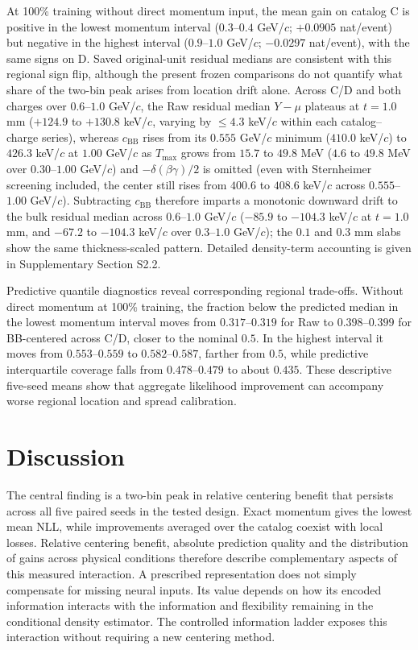 \documentclass[twocolumn,epjc3]{svjour3}
\begin{document}
At 100\% training without direct momentum input, the mean gain on catalog C
is positive in the lowest momentum interval ($0.3$--$0.4$ GeV/$c$;
$+0.0905$ nat/event) but negative in the highest interval
($0.9$--$1.0$ GeV/$c$; $-0.0297$ nat/event), with the same signs on D.
Saved original-unit residual medians are consistent with this regional sign
flip, although the present frozen comparisons do not quantify what share of the
two-bin peak arises from location drift alone. Across C/D and both charges over
$0.6$--$1.0$ GeV/$c$, the Raw residual median $Y-\mu$ plateaus at $t=1.0$ mm
($+124.9$ to $+130.8$ keV/$c$, varying by $\leq4.3$ keV/$c$ within each
catalog--charge series), whereas $c_{\mathrm{BB}}$ rises from its $0.555$
GeV/$c$ minimum ($410.0$ keV/$c$) to $426.3$ keV/$c$ at $1.00$ GeV/$c$ as
$T_{\max}$ grows from $15.7$ to $49.8$ MeV ($4.6$ to $49.8$ MeV over
$0.30$--$1.00$ GeV/$c$) and $-\delta(\beta\gamma)/2$ is omitted (even with
Sternheimer screening included, the center still rises from $400.6$ to
$408.6$ keV/$c$ across $0.555$--$1.00$ GeV/$c$). Subtracting
$c_{\mathrm{BB}}$ therefore imparts a monotonic downward drift to the bulk
residual median across $0.6$--$1.0$ GeV/$c$ ($-85.9$ to $-104.3$ keV/$c$ at
$t=1.0$ mm, and $-67.2$ to $-104.3$ keV/$c$ over $0.3$--$1.0$ GeV/$c$); the
$0.1$ and $0.3$ mm slabs show the same thickness-scaled pattern. Detailed
density-term accounting is given in Supplementary Section S2.2.

Predictive quantile diagnostics reveal corresponding regional trade-offs. Without
direct momentum at 100\% training, the fraction below the predicted median
in the lowest momentum interval moves from $0.317$--$0.319$ for Raw to
$0.398$--$0.399$ for BB-centered across C/D, closer to the nominal $0.5$.
In the highest interval it moves from $0.553$--$0.559$ to
$0.582$--$0.587$, farther from $0.5$, while predictive interquartile
coverage falls from $0.478$--$0.479$ to about $0.435$. These descriptive
five-seed means show that aggregate likelihood improvement can accompany
worse regional location and spread calibration.

\section{Discussion}
\label{sec:discussion}

The central finding is a two-bin peak in relative centering benefit that
persists across all five paired seeds in the tested design. Exact momentum
gives the lowest mean NLL, while improvements averaged over the catalog
coexist with local losses. Relative centering benefit, absolute prediction
quality and the distribution of gains across physical conditions therefore
describe complementary aspects of this measured interaction. A prescribed representation does not simply compensate
for missing neural inputs. Its value depends on how its encoded information
interacts with the information and flexibility remaining in the conditional
density estimator. The controlled information ladder exposes this interaction
without requiring a new centering method.
\end{document}
